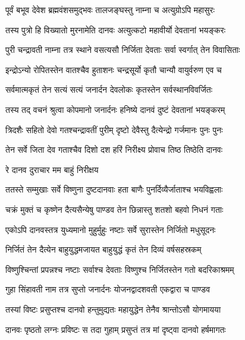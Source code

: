 
\twolineshloka
{पूर्वं बभूव देवेश ब्रह्मवंशसमुद्भवः}
{तालजङ्घस्तु नाम्ना च अत्युग्रोऽपि महासुरः}%

\twolineshloka
{तस्य पुत्रो हि विख्यातो मुरनामेति दानवः}
{अत्युत्कटो महावीर्यो देवतानां भयङ्करः}%

\twolineshloka
{पुरी चन्द्रावती नाम्ना तत्र स्थाने वसत्यसौ}
{निर्जिता देवताः सर्वा स्वर्गात् तेन विवासिताः}%

\twolineshloka
{इन्द्रोऽन्यो रोपितस्तेन वातश्चैव हुताशनः}
{चन्द्रसूर्यो कृतौ चान्यौ वायुर्वरुण एव च}%

\twolineshloka
{सर्वमात्मकृतं तेन सत्यं सत्यं जनार्दन}
{देवलोकः कृतस्तेन सर्वस्थानविवर्जितः}%

\twolineshloka
{तस्य तद् वचनं श्रुत्वा कोपमानो जनार्दनः}
{हनिष्ये दानवं दुष्टं देवतानां भयङ्करम्}%

\twolineshloka
{त्रिदशैः सहितो देवो गतश्चन्द्रावतीं पुरीम्}
{दृष्टो देवैस्तु दैत्येन्द्रो गर्जमानः पुनः पुनः}%

\twolineshloka
{तेन सर्वे जिता देव गताश्चैव दिशो दश}
{हरिं निरीक्ष्य प्रोवाच तिष्ठ तिष्ठेति दानवः}%



\onelineshloka
{रे दानव दुराचार मम बाहुं निरीक्षय}%

\twolineshloka
{ततस्ते सम्मुखाः सर्वे विष्णुना दुष्टदानवाः}
{हता बाणैः पुनर्दिव्यैर्जाताश्च भयविह्वलाः}%

\twolineshloka
{चक्रं मुक्तं च कृष्णेन दैत्यसैन्येषु पाण्डव}
{तेन छिन्नास्तु शतशो बहवो निधनं गताः}%

\twolineshloka
{एकोऽपि दानवस्तत्र युध्यमानो मुहुर्मुहुः}
{नष्टाः सर्वे सुरास्तेन निर्जितो मधुसूदनः}%

\twolineshloka
{निर्जितं तेन दैत्येन बाहुयुद्धमजायत}
{बाहुयुद्धं कृतं तेन दिव्यं वर्षसहस्रकम्}%

\twolineshloka
{विष्णुश्चिन्तां प्रपन्नश्च नष्टाः सर्वाश्च देवताः}
{विष्णुश्च निर्जितस्तेन गतो बदरिकाश्रमम्}%

\twolineshloka
{गुहा सिंहावती नाम तत्र सुप्तो जनार्दनः}
{योजनद्वादशवती एकद्वारा च पाण्डव}%

\twolineshloka
{तस्यां विष्टः प्रसुप्तश्च दानवो हन्तुमुद्यतः}
{महायुद्धेन तेनैव श्रान्तोऽसौ योगमायया}%

\twolineshloka
{दानवः पृष्ठतो लग्नः प्रविष्टः स तदा गुहाम्}
{प्रसुप्तं तत्र मां दृष्ट्वा दानवो हर्षमागतः}%

